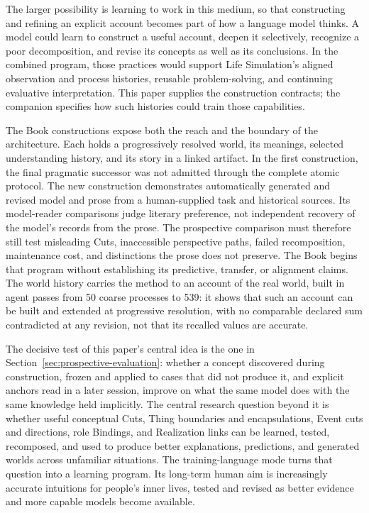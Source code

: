 \documentclass[11pt,a4paper]{article}
\begin{document}
The larger possibility is learning to work in this medium, so that constructing
and refining an explicit account becomes part of how a language model thinks. A
model could learn
to construct a useful account, deepen it selectively, recognize a poor
decomposition, and revise its concepts as well as its conclusions. In the
combined program, those practices would support Life Simulation's aligned
observation and process histories, reusable problem-solving, and continuing
evaluative interpretation. This paper supplies the construction contracts;
the companion specifies how such histories could train those capabilities.

The Book constructions expose both the reach and the boundary of the architecture.
Each holds a progressively resolved world, its meanings, selected understanding
history, and its story in a linked artifact. In the first construction, the
final pragmatic successor was not admitted through the complete atomic
protocol. The new construction demonstrates automatically generated and revised
model and prose from a human-supplied task and historical sources. Its model-reader
comparisons judge literary preference, not independent recovery of the model's
records from the prose. The prospective comparison must therefore
still test misleading Cuts, inaccessible perspective paths, failed
recomposition, maintenance cost, and distinctions the prose does not preserve.
The Book begins that program without establishing its predictive, transfer, or alignment claims.
The world history carries the method to an account of the real world, built in agent
passes from 50 coarse processes to 539: it shows that such an account can be
built and extended at progressive resolution, with no comparable declared sum
contradicted at any revision, not that its recalled values are accurate.

The decisive test of this paper's central idea is the one in
Section~\ref{sec:prospective-evaluation}: whether a concept discovered during
construction, frozen and applied to cases that did not produce it, and explicit
anchors read in a later session, improve on what the same model does with the
same knowledge held implicitly. The central research question beyond it is
whether useful conceptual Cuts, Thing
boundaries and encapsulations, Event cuts and directions, role Bindings, and
Realization links can be learned, tested, recomposed, and used to produce
better explanations, predictions, and generated worlds across unfamiliar
situations. The training-language
mode turns that question into a learning program. Its long-term human aim is
increasingly accurate intuitions for people's inner lives, tested and revised
as better evidence and more capable models become available.
\end{document}

